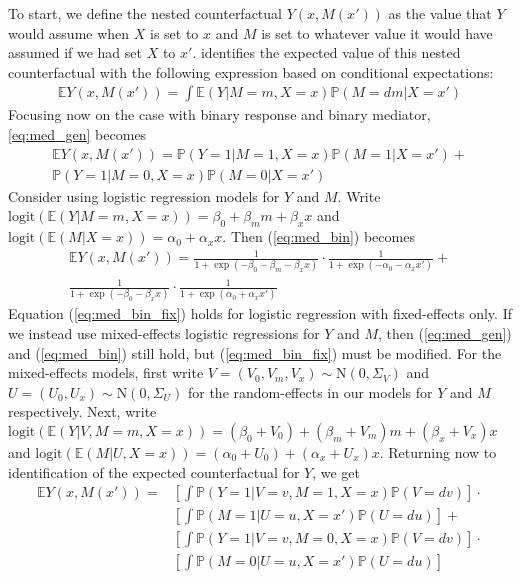 \documentclass{report}
\newcommand{\bP}{\mathbb{P}}
\newcommand{\bE}{\mathbb{E}}
\begin{document}
To start, we define the nested counterfactual $Y(x, M(x'))$ as the value that $Y$ would assume when $X$ is set to $x$ and $M$ is set to whatever value it would have assumed if we had set $X$ to $x'$. \citet{Pea12} identifies the expected value of this nested counterfactual with the following expression based on conditional expectations:
%
\begin{align}
    \bE Y(x, M(x')) = \int \bE(Y | M=m, X=x) \bP(M = dm | X = x') \label{eq:med_gen}
\end{align}
%
Focusing now on the case with binary response and binary mediator, \ref{eq:med_gen} becomes
%
\begin{multline}
    \bE Y(x, M(x')) = \bP(Y=1 | M=1, X=x) \bP(M=1 | X=x') + \\\bP(Y=1 | M=0, X=x) \bP(M=0 | X=x') \label{eq:med_bin}
\end{multline}
%
Consider using  logistic regression models for $Y$ and $M$. Write $\mathrm{logit}(\bE(Y | M=m, X=x)) = \beta_0 + \beta_m m + \beta_x x$ and $\mathrm{logit}(\bE(M | X=x)) = \alpha_0 + \alpha_x x$. Then (\ref{eq:med_bin}) becomes
%
\begin{multline}
    \bE Y(x, M(x')) = \frac{1}{1 + \exp(-\beta_0 - \beta_m - \beta_x x)} \cdot \frac{1}{1 + \exp(-\alpha_0 - \alpha_x x')} +\\
    \frac{1}{1 + \exp(-\beta_0 - \beta_x x)} \cdot \frac{1}{1 + \exp(\alpha_0 + \alpha_x x')} \label{eq:med_bin_fix}
\end{multline}
%
Equation (\ref{eq:med_bin_fix}) holds for logistic regression with fixed-effects only. If we instead use  mixed-effects logistic regressions for $Y$ and $M$, then (\ref{eq:med_gen}) and (\ref{eq:med_bin}) still hold, but (\ref{eq:med_bin_fix}) must be modified. For the mixed-effects models, first write $V = (V_0, V_m, V_x) \sim \mathrm{N}(0, \Sigma_V)$ and $U = (U_0, U_x) \sim \mathrm{N}(0, \Sigma_U)$ for the random-effects in our models for $Y$ and $M$ respectively. Next, write $\mathrm{logit}(\bE(Y | V, M=m, X=x)) = (\beta_0 + V_0) + (\beta_m + V_m) m + (\beta_x + V_x) x$ and $\mathrm{logit}(\bE(M |U, X=x)) = (\alpha_0 + U_0) + (\alpha_x + U_x) x$. Returning now to identification of the expected counterfactual for $Y$, we get
%
\begin{align}
    \bE Y(x, M(x')) =& \left[\int \bP(Y=1 |V=v, M=1, X=x) \bP(V = dv)\right] \cdot \\
    & \left[\int \bP(M=1 |U=u, X=x') \bP(U=du)\right] +\\
     & \left[\int \bP(Y=1 |V=v, M=0, X=x) \bP(V = dv)\right] \cdot \\
     & \left[\int \bP(M=0 |U=u, X=x') \bP(U=du)\right]
\end{align}
\end{document}
